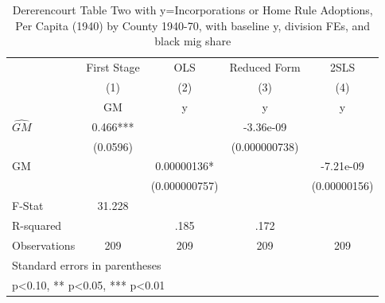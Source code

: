 \begin{table}[htbp]\centering
\def\sym#1{\ifmmode^{#1}\else\(^{#1}\)\fi}
\caption{Dererencourt Table Two with y=Incorporations or Home Rule Adoptions, Per Capita (1940) by County 1940-70, with baseline y, division FEs, and black mig share}
\begin{tabular}{l*{4}{c}}
\toprule
                    & First Stage   &         OLS   &Reduced Form   &        2SLS   \\
                    &\multicolumn{1}{c}{(1)}&\multicolumn{1}{c}{(2)}&\multicolumn{1}{c}{(3)}&\multicolumn{1}{c}{(4)}\\
                    &\multicolumn{1}{c}{GM}&\multicolumn{1}{c}{y}&\multicolumn{1}{c}{y}&\multicolumn{1}{c}{y}\\
\midrule
$\hat{GM}$          &       0.466***&               &   -3.36e-09   &               \\
                    &    (0.0596)   &               &(0.000000738)   &               \\
\addlinespace
GM                  &               &  0.00000136*  &               &   -7.21e-09   \\
                    &               &(0.000000757)   &               &(0.00000156)   \\
\midrule
F-Stat              &      31.228   &               &               &               \\
R-squared           &               &        .185   &        .172   &               \\
Observations        &         209   &         209   &         209   &         209   \\
\bottomrule
\multicolumn{5}{l}{\footnotesize Standard errors in parentheses}\\
\multicolumn{5}{l}{\footnotesize * p<0.10, ** p<0.05, *** p<0.01}\\
\end{tabular}
\end{table}
